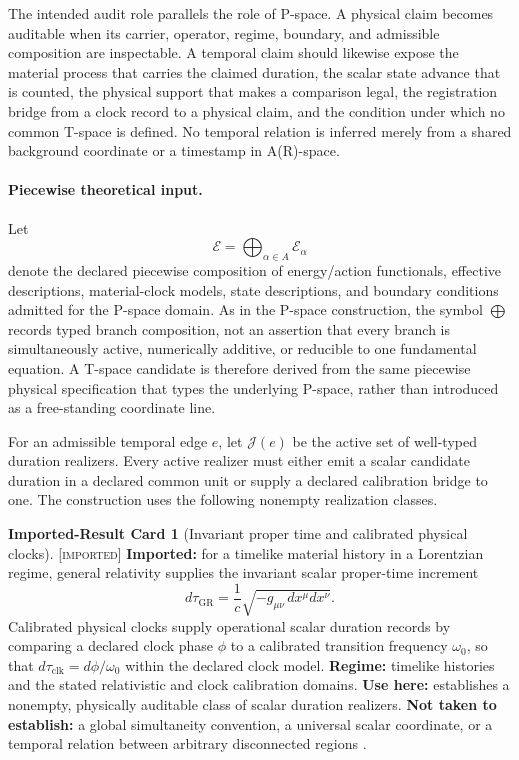 \documentclass[11pt]{article}
\newcommand{\Imp}{\textsc{[imported]}}
\theoremstyle{definition}
\newtheorem{scard}{Imported-Result Card}
\begin{document}
The intended audit role parallels the role of P-space. A physical claim becomes
auditable when its carrier, operator, regime, boundary, and admissible composition
are inspectable. A temporal claim should likewise expose the material process that
carries the claimed duration, the scalar state advance that is counted, the
physical support that makes a comparison legal, the registration bridge from a
clock record to a physical claim, and the condition under which no common T-space
is defined. No temporal relation is inferred merely from a shared background
coordinate or a timestamp in A(R)-space.

\paragraph{Piecewise theoretical input.}
Let
\begin{equation}
\mathcal E=\bigoplus_{\alpha\in A}\mathcal E_\alpha
\label{eq:tspace-piecewise-energy-action}
\end{equation}
denote the declared piecewise composition of energy/action functionals,
effective descriptions, material-clock models, state descriptions, and boundary
conditions admitted for the P-space domain. As in the P-space construction, the
symbol $\bigoplus$ records typed branch composition, not an assertion that every
branch is simultaneously active, numerically additive, or reducible to one
fundamental equation. A T-space candidate is therefore derived from the same
piecewise physical specification that types the underlying P-space, rather than
introduced as a free-standing coordinate line.

For an admissible temporal edge $e$, let $\mathcal J(e)$ be the active set of
well-typed duration realizers. Every active realizer must either emit a scalar
candidate duration in a declared common unit or supply a declared calibration
bridge to one. The construction uses the following nonempty realization classes.

\begin{scard}[Invariant proper time and calibrated physical clocks]
\label{card:tspace-proper-clock}
\Imp{} \textbf{Imported:} for a timelike material history in a Lorentzian regime,
general relativity supplies the invariant scalar proper-time increment
\begin{equation}
d\tau_{\mathrm{GR}}
=
\frac{1}{c}\sqrt{-g_{\mu\nu}\,dx^\mu dx^\nu}.
\label{eq:tspace-proper-time}
\end{equation}
Calibrated physical clocks supply operational scalar duration records by comparing
a declared clock phase $\phi$ to a calibrated transition frequency $\omega_0$,
so that $d\tau_{\mathrm{clk}}=d\phi/\omega_0$ within the declared clock model.
\textbf{Regime:} timelike histories and the stated relativistic and clock
calibration domains. \textbf{Use here:} establishes a nonempty, physically
auditable class of scalar duration realizers. \textbf{Not taken to establish:} a
global simultaneity convention, a universal scalar coordinate, or a temporal
relation between arbitrary disconnected regions
\cite{S_Einstein1916,S_Chou2010}.
\end{scard}
\end{document}
